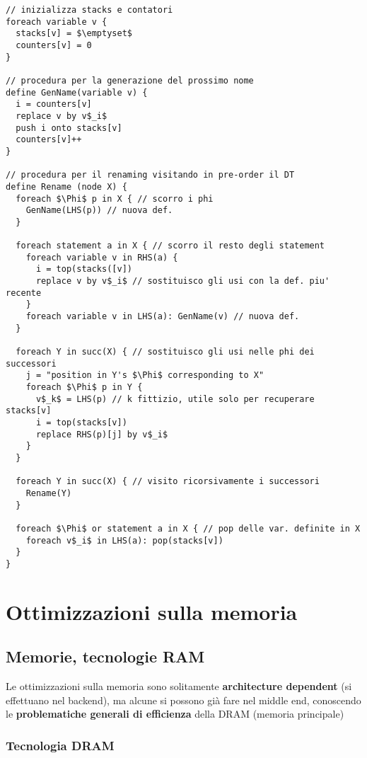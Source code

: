 \begin{lstlisting}[morekeywords={foreach,statement,node,variable,in,remove,from,insert,defined,replace,define,push,onto,by}]
// inizializza stacks e contatori
foreach variable v {
  stacks[v] = $\emptyset$
  counters[v] = 0
}

// procedura per la generazione del prossimo nome
define GenName(variable v) {
  i = counters[v]
  replace v by v$_i$
  push i onto stacks[v]
  counters[v]++
}

// procedura per il renaming visitando in pre-order il DT
define Rename (node X) {
  foreach $\Phi$ p in X { // scorro i phi
    GenName(LHS(p)) // nuova def.
  } 

  foreach statement a in X { // scorro il resto degli statement
    foreach variable v in RHS(a) {
      i = top(stacks([v])
      replace v by v$_i$ // sostituisco gli usi con la def. piu' recente
    }
    foreach variable v in LHS(a): GenName(v) // nuova def.
  }

  foreach Y in succ(X) { // sostituisco gli usi nelle phi dei successori
    j = "position in Y's $\Phi$ corresponding to X"
    foreach $\Phi$ p in Y { 
      v$_k$ = LHS(p) // k fittizio, utile solo per recuperare stacks[v]
      i = top(stacks[v])
      replace RHS(p)[j] by v$_i$
    }
  }

  foreach Y in succ(X) { // visito ricorsivamente i successori
    Rename(Y)
  }

  foreach $\Phi$ or statement a in X { // pop delle var. definite in X
    foreach v$_i$ in LHS(a): pop(stacks[v])
  }
}\end{lstlisting}

\section{Ottimizzazioni sulla memoria}

\subsection{Memorie, tecnologie RAM}

Le ottimizzazioni sulla memoria sono solitamente \textbf{architecture dependent} (si effettuano nel backend), ma alcune si possono gi\`a fare nel middle end, conoscendo le \textbf{problematiche generali di efficienza} della DRAM (memoria principale)

\subsubsection{Tecnologia DRAM}

